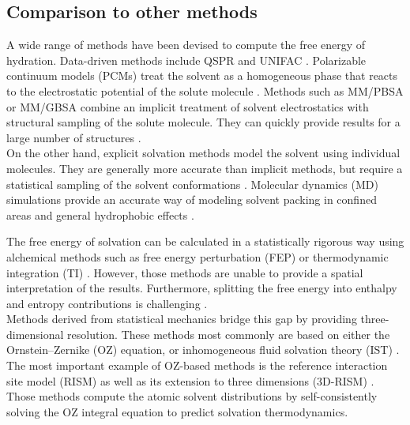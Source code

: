 \documentclass[9pt,tutorial]{livecoms}
\begin{document}
\subsection{Comparison to other methods}
A wide range of methods have been devised to compute the free energy of hydration.
Data-driven methods include QSPR and UNIFAC \cite{Borhani2019-qspr,Fredenslund1975-unifac}.
Polarizable continuum models (PCMs) \cite{Miertus1981-pcm,Klamt1993-cosmo} treat the solvent as a homogeneous phase that reacts to the electrostatic potential of the solute molecule \cite{Mennucci2010-pcm}.
Methods such as MM/PBSA or MM/GBSA \cite{Sitkoff1994-pbsa,Kollman2000-mmpbsa} combine an implicit treatment of solvent electrostatics with structural sampling of the solute molecule.
They can quickly provide results for a large number of structures \cite{Genheden2015-mmpbsa-review}.\\
On the other hand, explicit solvation methods model the solvent using individual molecules.
They are generally more accurate than implicit methods, but require a statistical sampling of the solvent conformations \cite{Liu2016-md-solubility,Swails2014-cphmd}.
Molecular dynamics (MD) simulations provide an accurate way of modeling solvent packing in confined areas \cite{Haider2016-water-on-surfaces} and general hydrophobic effects \cite{Pratt2016-hydrophobicity}.

The free energy of solvation can be calculated in a statistically rigorous way using alchemical methods \cite{Liu2016-md-solubility,Mobley2009-dgsolv,Mobley2014-freesolv} such as free energy perturbation (FEP) \cite{Zwanzig1954-reweighting} or thermodynamic integration (TI) \cite{Kirkwood1935-ti}.
However, those methods are unable to provide a spatial interpretation of the results.
Furthermore, splitting the free energy into enthalpy and entropy contributions is challenging \cite{Peter2004-alchemical-entropy}.\\
Methods derived from statistical mechanics bridge this gap by providing three-dimensional resolution.
These methods most commonly are based on either the Ornstein–Zernike (OZ) equation, or \cite{Hansen2013-simple-liquids} inhomogeneous fluid solvation theory (IST) \cite{Lazaridis1998}.
The most important example of OZ-based methods is the reference interaction site model (RISM) \cite{Chandler1972-rism} as well as its extension to three dimensions (3D-RISM) \cite{Kovalenko1998-3drism}.
Those methods compute the atomic solvent distributions by self-consistently solving the OZ integral equation to predict solvation thermodynamics.
\end{document}
